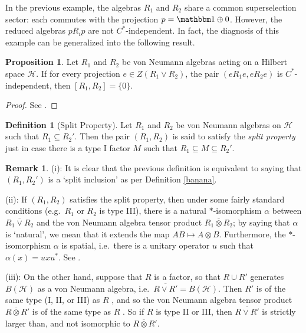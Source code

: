 \documentclass[12pt]{article}
\theoremstyle{definition}
\newtheorem{prop}[thm]{Proposition}
\theoremstyle{definition}
\newtheorem{defn}[thm]{Definition}
\newtheorem{rema}[thm]{Remark}
\theoremstyle{remark}
\def\2#1{{\mathcal #1}}
\def\8#1{{\mathbbm #1}}
\def\ol#1{{\overline #1}}
\def\a{\alpha} \def\b{\beta} \def\g{\gamma} \def\d{\delta}
\begin{document}
In the previous example, the algebras $R_1$ and $R_2$ share a common
superselection sector: each commutes with the projection $p=\81 \oplus
0$.  However, the reduced algebras $pR_ip$ are not $C^*$-independent.
In fact, the diagnosis of this example can be generalized into the
following result.

\begin{prop} Let $R_1$ and $R_2$ be von Neumann algebras acting on a
  Hilbert space $\2H$.  If for every projection $e\in Z(R_1\vee R_2
  )$, the pair $(eR_1e,eR_2e)$ is $C^*$-independent, then
  $[R_1,R_2]=\{ 0\}$.
\end{prop}

\begin{proof} See \cite{sumbuc}. \end{proof}

\begin{defn}[Split Property] Let $R_ 1$ and $R_2$ be von Neumann
  algebras on $\2H$ such that $R_1\subseteq R_2'$.  Then the pair
  $(R_1,R_2)$ is said to satisfy the \emph{split property} just in
  case there is a type I factor $M$ such that $R_1\subseteq M\subseteq
  R_2'$.  \end{defn}

\begin{rema} (i): It is clear that the previous
  definition is equivalent to saying that $(R_1,R_2')$
  is a `split inclusion' as per Definition
  \ref{banana}.

  (ii): If $(R_1,R_2)$ satisfies the split property,
  then under some fairly standard conditions (e.g.\
  $R_1$ or $R_2$ is type III), there is a natural
  $*$-isomorphism $\a$ between $\overline{R_1\vee R_2}$
  and the von Neumann algebra tensor product
  $R_1\overline{\otimes}R_2$; by saying that $\a$ is
  `natural', we mean that it extends the map $AB\mapsto
  A\otimes B$.  Furthermore, the $*$-isomorphism $\a$
  is spatial, i.e.\ there is a unitary operator $u$
  such that $\a (x)=uxu^*$.  See \cite[p.\ 212]{sum}.

  (iii): On the other hand, suppose that $R$ is a factor, so that
  $R\cup R'$ generates $B(\2H )$ as a von Neumann algebra, i.e.\
  $\overline{R\vee R'}=B(\2H )$.  Then $R'$ is of the same type (I,
  II, or III) as $R$ \cite[Thm.\ 9.1.3]{kr}, and so the von Neumann
  algebra tensor product $R\ol \otimes R'$ is of the same type as $R$
  \cite[p.\ 830]{kr}.  So if $R$ is type II or III, then
  $\overline{R\vee R'}$ is strictly larger than, and not isomorphic to
  $R\ol \otimes R'$.
\end{rema}
\end{document}
